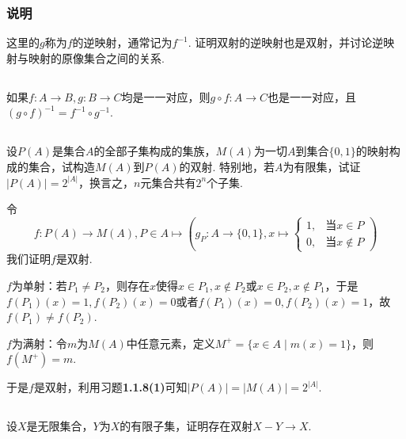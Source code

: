\subsubsection{说明}
这里的$g$称为$f$的{\heiti 逆映射}，通常记为$f^{-1}$. 证明双射的逆映射也是双射，并讨论逆映射与映射的原像集合之间的关系.

\Proofbyintimidation

\subsection{}
如果$f:A\rightarrow B, g:B\rightarrow C$均是一一对应，则$g\circ f:A\rightarrow C$也是一一对应，且$(g\circ f)^{-1}=f^{-1}\circ g^{-1}$.


\subsection{}
设$P(A)$是集合$A$的全部子集构成的集族，$M(A)$为一切$A$到集合$\{0,1\}$的映射构成的集合，试构造$M(A)$到$P(A)$的双射. 特别地，若$A$为有限集，试证$|P(A)|=2^{|A|}$，换言之，$n$元集合共有$2^n$个子集.

\jie 令
$$f:P(A)\rightarrow M(A), P\in A\mapsto \left(
g_P: A\rightarrow \{0,1\},
x\mapsto
\left\{
\begin{matrix}
1, & \text{当}x\in P\\
0, & \text{当}x\notin P
\end{matrix}
\right.
\right)$$
我们证明$f$是双射.

$f$为单射：若$P_1\neq P_2$，则存在$x$使得$x\in P_1, x\notin P_2$或$x\in P_2, x\notin P_1$，于是$f(P_1)(x)=1,f(P_2)(x)=0$或者$f(P_1)(x)=0,f(P_2)(x)=1$，故$f(P_1)\neq f(P_2)$.

$f$为满射：令$m$为$M(A)$中任意元素，定义$M^+=\{x\in A\mid m(x)=1\}$，则$f(M^+)=m$.

于是$f$是双射，利用{\heiti 习题}\textbf{1.1.8(1)}可知$|P(A)|=|M(A)|=2^{|A|}$.

\subsection{}
设$X$是无限集合，$Y$为$X$的有限子集，证明存在双射$X-Y\rightarrow X$.

